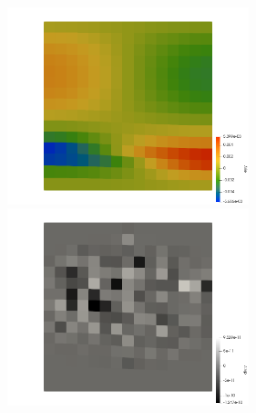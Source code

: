 \begin{center}
\includegraphics[width=7cm]{python_codes/fieldstone_25/images/eyy}
\includegraphics[width=7cm]{python_codes/fieldstone_25/images/divv}
\end{center}








